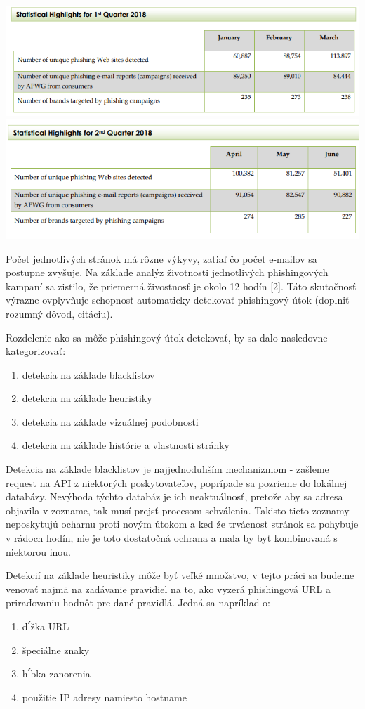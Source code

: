 \documentclass[
  digital, %
  twoside, %
  table,   %
  nolof,     %
  nolot,     %
]{fithesis3}
\begin{document}
\includegraphics[width=1.0\textwidth]{images/2018q1.png}
\includegraphics[width=1.0\textwidth]{images/2018q2.png}

Počet jednotlivých stránok má rôzne výkyvy, zatiaľ čo počet e-mailov sa postupne zvyšuje. Na základe analýz životnosti jednotlivých phishingových kampaní sa zistilo, že priemerná živostnosť je okolo 12 hodín [2]. Táto skutočnosť výrazne ovplyvňuje schopnosť automaticky detekovať phishingový útok (doplniť rozumný dôvod, citáciu).

Rozdelenie ako sa môže phishingový útok detekovať, by sa dalo nasledovne kategorizovať:
\begin{enumerate}
    \item detekcia na základe blacklistov
    \item detekcia na základe heuristiky
    \item detekcia na základe vizuálnej podobnosti
    \item detekcia na základe histórie a vlastnosti stránky
\end{enumerate}

Detekcia na základe blacklistov je najjednoduhším mechanizmom - zašleme request na API z niektorých poskytovateľov, poprípade sa pozrieme do lokálnej databázy. Nevýhoda týchto databáz je ich neaktuálnosť, pretože aby sa adresa objavila v zozname, tak musí prejsť procesom schválenia. Takisto tieto zoznamy neposkytujú ocharnu proti novým útokom a keď že trvácnosť stránok sa pohybuje v rádoch hodín, nie je toto dostatočná ochrana a mala by byť kombinovaná s niektorou inou.

Detekcií na základe heuristiky môže byť veľké množstvo, v tejto práci sa budeme venovať najmä na zadávanie pravidiel na to, ako vyzerá phishingová URL a priraďovaniu hodnôt pre dané pravidlá. Jedná sa napríklad o:
\begin{enumerate}
    \item dĺžka URL
    \item špeciálne znaky
    \item hĺbka zanorenia
    \item použitie IP adresy namiesto hostname
\end{enumerate}
\end{document}
